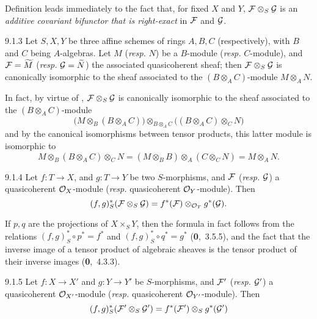Definition  leads immediately to the fact that, for fixed $X$ and
$Y$, $\mathcal{F}\otimes_S\mathcal{G}$ is an \emph{additive covariant bifunctor that
is right-exact} in $\mathcal{F}$ and $\mathcal{G}$.

\begin{env}[Proposition]{9.1.3}
\label{prop-1.9.1.3}
Let $S,X,Y$ be three affine schemes of rings
$A,B,C$ (respectively), with $B$ and $C$ being $A$-algebras. Let $M$
(\emph{resp.} $N$) be a $B$-module (\emph{resp.} $C$-module), and
$\mathcal{F}=\widetilde{M}$ (\emph{resp.} $\mathcal{G}=\widetilde{N}$) the
associated quasicoherent sheaf; then $\mathcal{F}\otimes_S\mathcal{G}$ is
canonically isomorphic to the sheaf associated to the $(B\otimes_A C)$-module
$M\otimes_A N$.
\end{env}

In fact, by virtue of , $\mathcal{F}\otimes_S\mathcal{G}$
is canonically isomorphic to the sheaf associated to the $(B\otimes_A C)$-module
\[
  \big(M\otimes_B(B\otimes_A C)\big)\otimes_{B\otimes_A C}\big((B\otimes_A C)\otimes_C N\big)
\]
and by the canonical isomorphisms between tensor
products, this latter module is isomorphic to
\[
  M\otimes_B(B\otimes_A C)\otimes_C N=(M\otimes_B B)\otimes_A(C\otimes_C N)=M\otimes_A N.
\]

\begin{env}[Proposition]{9.1.4}
\label{prop-1.9.1.4}
Let $f\colon T\to X$, and $g\colon T\to Y$ be
two $S$-morphisms, and $\mathcal{F}$ (\emph{resp.} $\mathcal{G}$) a quasicoherent
$\mathcal{O}_X$-module (\emph{resp.} quasicoherent $\mathcal{O}_Y$-module). Then
\[
  (f,g)^\ast_S(\mathcal{F}\otimes_S\mathcal{G})=f^\ast(\mathcal{F})\otimes_{\mathcal{O}_T}g^\ast(\mathcal{G}).
\]
\end{env}

If $p,q$ are the projections of $X\times_S Y$, then the formula in fact follows
from the relations $(f,g)^\ast_S\circ p^\ast=f^\ast$ and
$(f,g)^\ast_S\circ q^\ast=g^\ast$ (\textbf{0},~3.5.5), and the fact that the inverse
image of a tensor product of algebraic sheaves is the tensor product of their inverse
images (\textbf{0},~4.3.3).

\begin{env}[Corollary]{9.1.5}
\label{cor-1.9.1.5}
Let $f\colon X\to X'$ and $g\colon Y\to Y'$ be
$S$-morphisms, and $\mathcal{F}'$ (\emph{resp.} $\mathcal{G}'$) a quasicoherent
$\mathcal{O}_{X'}$-module (\emph{resp.} quasicoherent $\mathcal{O}_{Y'}$-module). Then
\[
  (f,g)^\ast_S(\mathcal{F}'\otimes_S\mathcal{G}')
  =f^\ast(\mathcal{F}')\otimes_S g^\ast(\mathcal{G}')
\]
\end{env}

